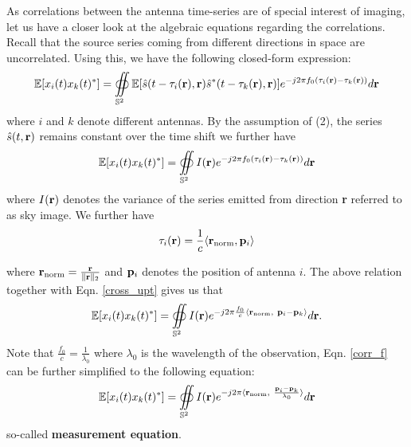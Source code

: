 \documentclass{article}
\begin{document}
As correlations between the antenna time-series are of special interest of imaging, let us have a closer look at the algebraic equations regarding the correlations. Recall that the source series coming from different directions in space are uncorrelated. Using this, we have the following closed-form expression:
 \begin{equation}
 \mathbb{E}[x_i(t)x_k(t)^*] = \oiint\displaylimits_{\mathbb{S}^2} \mathbb{E}[\hat{s}(t-\tau_i({\bf r}),{\bf r})\hat{s}^*(t-\tau_k({\bf r}),{\bf r})]e^{-j2\pi f_0 (\tau_i({\bf r})-\tau_k({\bf r}))}d{\bf r} \label{cross_corr}
 \end{equation}
 where $i$ and $k$ denote different antennas.
 By the assumption of (2), the series $\hat{s}(t,{\bf r})$ remains constant over the time shift we further have 
 \begin{equation}
 \mathbb{E}[x_i(t)x_k(t)^*] = \oiint\displaylimits_{\mathbb{S}^2} {I}({\bf r}) e^{-j2\pi f_0 (\tau_i({\bf r})-\tau_k({\bf r}))} d {\bf r} \label{cross_upt}
 \end{equation}
 where ${I}({\bf r})$ denotes the variance of the series emitted from direction {\bf r} referred to as sky image. We further have
\begin{equation}
\tau_{i}({\bf r}) = \frac{1}{c} \langle {\bf r}_{\text{norm}}, {\bf p}_i\rangle \label{tau}
\end{equation}

where ${\bf r}_{\text{norm}} = \frac{{\bf r}}{\| {\bf r}\|_2}$ and ${\bf{p}}_i$ denotes the position of antenna $i$.
The above relation together with Eqn. \ref{cross_upt} gives us that
\begin{equation}
 \mathbb{E}[x_i(t)x_k(t)^*] = \oiint\displaylimits_{\mathbb{S}^2} {I}({\bf r}) e^{-j2\pi \frac{f_0}{c} \langle {\bf r}_{\text{norm}},  \ {\bf p}_i -{\bf p}_k\rangle }d{\bf r}.\label{corr_f}
\end{equation}
Note that $\frac{f_0}{c} = \frac{1}{\lambda_0}$ where $\lambda_0$ is the wavelength of the observation, Eqn. \ref{corr_f} can be further simplified to the following equation:
\begin{equation}
 \mathbb{E}[x_i(t)x_k(t)^*] = \oiint\displaylimits_{\mathbb{S}^2} {I}({\bf r}) e^{-j2\pi \langle {\bf r}_{\text{norm}},  \ \frac{{\bf p}_i -{\bf p}_k}{\lambda_0}\rangle }d{\bf r}\label{corr_four}
\end{equation}
so-called {\bf measurement equation}.
\end{document}
